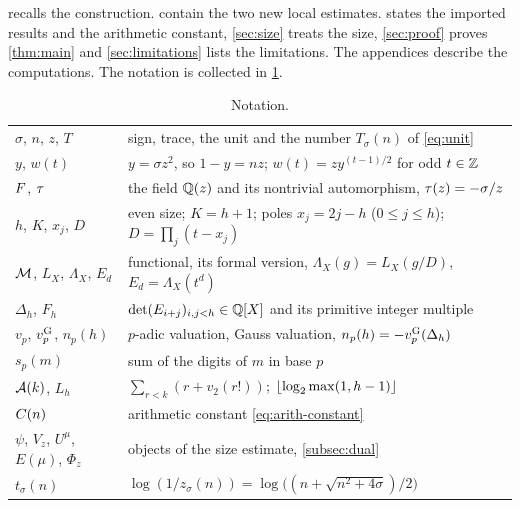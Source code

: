  recalls the construction.  contain the two
new local estimates.  states the imported results and the arithmetic constant,
\cref{sec:size} treats the size, \cref{sec:proof} proves \cref{thm:main} and
\cref{sec:limitations} lists the limitations. The appendices describe the computations. The
notation is collected in \cref{tab:notation}.

\begin{table}[ht]
\centering\small
\caption{Notation.}\label{tab:notation}
\begin{tabular}{@{}p{}p{}@{}}
\toprule
$\sigma$, $n$, $z$, $T$ & sign, trace, the unit and the number $T_\sigma(n)$ of \eqref{eq:unit}\\
$y$, $w(t)$ & $y=\sigma z^2$, so $1-y=nz$; $w(t)=zy^{(t-1)/2}$ for odd $t\in\mathbb{Z}$\\
$F$, $\tau$ & the field $\mathbb{Q}(z)$ and its nontrivial automorphism, $\tau(z)=-\sigma/z$\\
$h$, $K$, $x_j$, $D$ & even size; $K=h+1$; poles $x_j=2j-h$ ($0\le j\le h$); $D=\prod_j(t-x_j)$\\
$\mathcal{M}$, $L_X$, $\Lambda_X$, $E_d$ & functional, its formal version, $\Lambda_X(g)=L_X(g/D)$, $E_d=\Lambda_X(t^d)$\\
$\Delta_h$, $F_h$ & $\det(E_{i+j})_{i,j<h}\in\mathbb{Q}[X]$ and its primitive integer multiple\\
$v_p$, $v_{p}^{\mathrm{G}}$, $n_p(h)$ & $p$-adic valuation, Gauss valuation, $n_p(h)=-v_{p}^{\mathrm{G}}(\Delta_h)$\\
$s_p(m)$ & sum of the digits of $m$ in base $p$\\
$\mathcal{A}(k)$, $L_h$ & $\sum_{r<k}(r+v_2(r!))$; $\left\lfloor \log_2\max(1,h-1)\right\rfloor$\\
$C(n)$ & arithmetic constant \eqref{eq:arith-constant}\\
$\psi$, $V_z$, $U^\mu$, $E(\mu)$, $\Phi_z$ & objects of the size estimate, \cref{subsec:dual}\\
$t_\sigma(n)$ & $\log(1/z_\sigma(n))=\log\bigl((n+\sqrt{n^2+4\sigma})/2\bigr)$\\
\bottomrule
\end{tabular}
\end{table}
